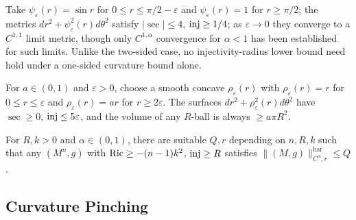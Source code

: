 \begin{example}
  \label{ex:pet-ch11-c11-limit-example}
  Take $\psi_\varepsilon(r)=\sin r$ for $0\le r\le\pi/2-\varepsilon$ and
  $\psi_\varepsilon(r)=1$ for $r\ge\pi/2$; the metrics
  $dr^2+\psi_\varepsilon^2(r)d\theta^2$ satisfy $|\sec|\le4$, $\operatorname{inj}\ge1/4$; as
  $\varepsilon\to0$ they converge to a $C^{1,1}$ limit metric, though only
  $C^{1,\alpha}$ convergence for $\alpha<1$ has been established for such
  limits. Unlike the two-sided case, no injectivity-radius lower bound need
  hold under a one-sided curvature bound alone.
\end{example}

\begin{remark}
  \label{rem:pet-ch11-exercise-11-4-14}
  For $a\in(0,1)$ and $\varepsilon>0$, choose a smooth concave
  $\rho_\varepsilon(r)$ with $\rho_\varepsilon(r)=r$ for $0\le r\le\varepsilon$
  and $\rho_\varepsilon(r)=ar$ for $r\ge2\varepsilon$. The surfaces
  $dr^2+\rho_\varepsilon^2(r)d\theta^2$ have $\sec\ge0$, $\operatorname{inj}\le5\varepsilon$,
  and the volume of any $R$-ball is always $\ge a\pi R^2$.
\end{remark}

\begin{theorem}
  \label{thm:pet-ch11-anderson-cheeger-ricci-lower-bound-norm}
  For $R,k>0$ and $\alpha\in(0,1)$, there are suitable $Q,r$ depending on
  $n,R,k$
  such that any $(M^n,g)$ with $\operatorname{Ric}\ge-(n-1)k^2$, $\operatorname{inj}\ge R$ satisfies
  $\|(M,g)\|^{\mathrm{har}}_{C^{\alpha},r}\le Q$.
\end{theorem}

\subsection{Curvature Pinching}

